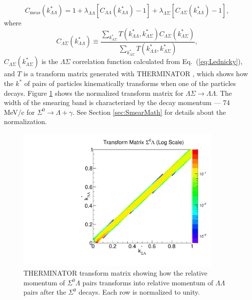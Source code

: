 \begin{equation}
\label{eq:Residual}
C_{\mathrm{meas}}(k^*_{\Lambda\Lambda})= 1 + \lambda_{\Lambda\Lambda}[C_{\Lambda\Lambda}(k^*_{\Lambda\Lambda})-1]+\lambda_{\Lambda\Sigma}[C_{\Lambda\Sigma}(k^*_{\Lambda\Lambda})-1],
\end{equation}
where 
\begin{equation}
\label{eq:ResCorSmear}
C_{\Lambda\Sigma}(k^*_{\Lambda\Lambda}) \equiv \frac{\displaystyle\sum\limits_{k^*_{\Lambda\Sigma}}T(k^*_{\Lambda\Lambda},k^*_{\Lambda\Sigma})C_{\Lambda\Sigma}(k^*_{\Lambda\Sigma})}{\displaystyle\sum\limits_{k^*_{\Lambda\Sigma}}T(k^*_{\Lambda\Lambda},k^*_{\Lambda\Sigma})},
\end{equation}
$C_{\Lambda\Sigma}(k^*_{\Lambda\Sigma})$ is the $\Lambda\Sigma$ correlation function calculated from Eq.~(\ref{eq:Lednicky}), and $T$ is a transform matrix generated with THERMINATOR \cite{Chojnacki:2011hb}, which shows how the $k^*$ of pairs of particles kinematically transforms when one of the particles decays.  
Figure \ref{fig:TherminatorLS} shows the normalized transform matrix for $\Lambda\Sigma \rightarrow \Lambda\Lambda$.
The width of the smearing band is characterized by the decay momentum --- 74 MeV/c for $\Sigma^0 \rightarrow \Lambda + \gamma$.
See Section \ref{sec:SmearMath} for details about the normalization.


\begin{figure}[hbtp]
\begin{center}
\includegraphics[width=24pc]{Figures/TransformMatrices/2016-7-20-TransformMatrixSigmaLambdaNormLog.pdf}
\end{center}
\caption[Transform matrix for $k^*_{\Sigma^0\Lambda} \rightarrow k^*_{\Lambda\Lambda}$]{THERMINATOR \cite{Chojnacki:2011hb} transform matrix showing how the relative momentum of $\Sigma^0\Lambda$ pairs transforms into relative momentum of $\Lambda\Lambda$ pairs after the $\Sigma^0$ decays. Each row is normalized to unity.}
\label{fig:TherminatorLS}
\end{figure}

